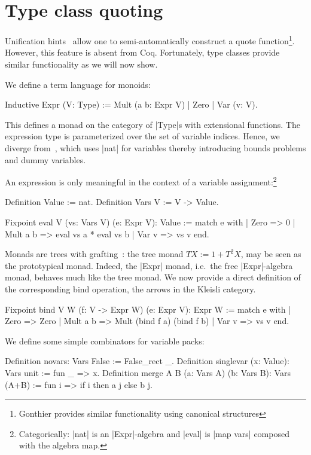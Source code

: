 \documentclass[a4paper,10pt, runningheads]{llncs}
\begin{document}
\section{Type class quoting}\label{quote}
Unification hints~\cite{Hints} allow one to semi-automatically construct a quote
function\footnote{Gonthier provides similar functionality using canonical structures}. However,
this feature is absent from Coq. Fortunately, type classes provide similar functionality as
we will now show.

We define a term language for monoids:
\begin{code}
Inductive Expr (V: Type) := Mult (a b: Expr V) | Zero | Var (v: V).
\end{code}
This defines a monad on the category of |Type|s with extensional functions.
The expression type is parameterized over the set of variable indices. Hence, we diverge
 from~\cite{Hints}, which uses |nat| for variables thereby introducing bounds problems and
 dummy variables.

\noindent An expression is only meaningful in the context of a variable
assignment:\footnote{Categorically: |nat| is
an |Expr|-algebra and |eval| is |map vars| composed with the algebra map.}
\begin{code}
Definition Value := nat.
Definition Vars V := V -> Value.

Fixpoint eval {V} (vs: Vars V) (e: Expr V): Value :=
  match e with
  | Zero => 0
  | Mult a b => eval vs a * eval vs b
  | Var v => vs v
  end.
\end{code}
%
Monads are trees with grafting~\cite{MonadsGrafting}: the tree monad
$TX:=1+T^2X$, may be seen as the prototypical monad. Indeed, the |Expr| monad, i.e.\ the free
|Expr|-algebra monad, behaves much like the tree monad. We now provide a direct definition of the
corresponding bind operation, the arrows in the Kleisli category.

\begin{code}
Fixpoint bind {V W} (f: V -> Expr W) (e: Expr V): Expr W :=
  match e with
  | Zero => Zero
  | Mult a b => Mult (bind f a) (bind f b)
  | Var v => vs v
  end.
\end{code}


\noindent We define some simple combinators for variable packs:
%
\begin{code}
Definition novars: Vars False := False_rect _.
Definition singlevar (x: Value): Vars unit := fun _ => x.
Definition merge {A B} (a: Vars A) (b: Vars B): Vars (A+B) :=
  fun i => if i then a j else b j.
\end{code}
\end{document}
